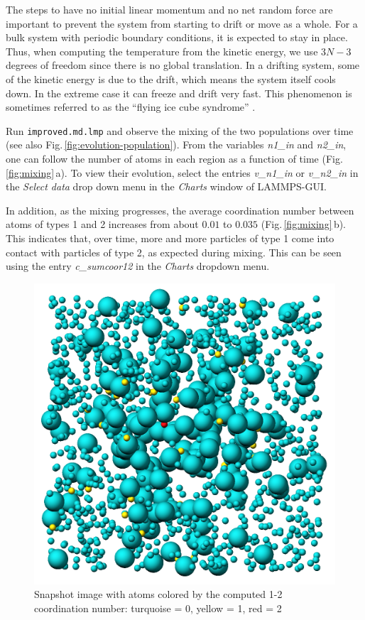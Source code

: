 \documentclass[9pt,tutorial]{livecoms}
\newcommand{\flecmd}[1]{\textcolor{command}{\texttt{#1}}} %
\begin{document}
The steps to have no initial linear momentum and no net random force are
important to prevent the system from starting to drift or move as a
whole.  For a bulk system with periodic boundary conditions, it is
expected to stay in place. Thus, when computing the temperature from the
kinetic energy, we use $3N-3$ degrees of freedom since there is no
global translation.  In a drifting system, some of the kinetic energy is
due to the drift, which means the system itself cools down.  In the
extreme case it can freeze and drift very fast. This phenomenon is
sometimes referred to as the ``flying ice cube syndrome''
\cite{wong2016good}.

Run \flecmd{improved.md.lmp} and observe the mixing of the two populations
over time (see also Fig.\,\ref{fig:evolution-population}).  From the
variables \textit{n1\_in} and \textit{n2\_in}, one can follow the number
of atoms in each region as a function of time
(Fig.\,\ref{fig:mixing}\,a).  To view their evolution, select the entries
\textit{v\_n1\_in} or \textit{v\_n2\_in} in the \textit{Select data} drop
down menu in the \textit{Charts} window of LAMMPS-GUI.

In addition, as the mixing progresses, the average coordination number
between atoms of types 1 and 2 increases from about $0.01$ to $0.035$
(Fig.\,\ref{fig:mixing}\,b).  This indicates that, over time, more and
more particles of type 1 come into contact with particles of type 2, as
expected during mixing.  This can be seen using the entry
\textit{c\_sumcoor12} in the \textit{Charts} dropdown menu.

\begin{figure}
\centering
\includegraphics[width=0.55\linewidth]{LJ-coords}
\caption{Snapshot image with atoms colored by the computed 1-2 coordination
  number: turquoise = 0, yellow = 1, red = 2}
\label{fig:coords-viz}
\end{figure}
\end{document}

